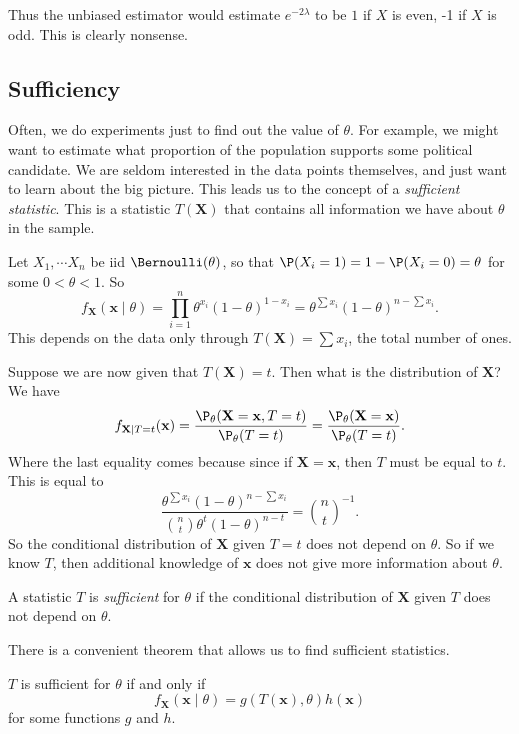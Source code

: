 \documentclass[a4paper]{article}
\begin{document}
Thus the unbiased estimator would estimate $e^{-2\lambda}$ to be $1$ if $X$ is even, -1 if $X$ is odd. This is clearly nonsense.
\subsection{Sufficiency}
Often, we do experiments just to find out the value of $\theta$. For example, we might want to estimate what proportion of the population supports some political candidate. We are seldom interested in the data points themselves, and just want to learn about the big picture. This leads us to the concept of a \emph{sufficient statistic}. This is a statistic $T(\mathbf{X})$ that contains all information we have about $\theta$ in the sample.

\begin{eg}
  Let $X_1, \cdots X_n$ be iid $\Bernoulli(\theta)$, so that $\P(X_i = 1) = 1 - \P(X_i = 0) = \theta$ for some $0 < \theta < 1$. So
  \[
    f_{\mathbf{X}} (\mathbf{x}\mid \theta) = \prod_{i = 1}^n \theta^{x_i}(1 - \theta)^{1 - x_i} = \theta^{\sum x_i}(1 - \theta)^{n - \sum x_i}.
  \]
  This depends on the data only through $T(\mathbf{X}) = \sum x_i$, the total number of ones.

  Suppose we are now given that $T(\mathbf{X}) = t$. Then what is the distribution of $\mathbf{X}$? We have
  \[
    f_{\mathbf{X}\mid T = t}(\mathbf{x}) = \frac{\P_\theta(\mathbf{X} = \mathbf{x}, T = t)}{\P_\theta (T = t)} = \frac{\P_\theta(\mathbf{X} = \mathbf{x})}{\P_\theta(T = t)}.
  \]
  Where the last equality comes because since if $\mathbf{X} = \mathbf{x}$, then $T$ must be equal to $t$. This is equal to
  \[
    \frac{\theta^{\sum x_i}(1 - \theta)^{n - \sum x_i}}{\binom{n}{t}\theta^t (1 - \theta)^{n - t}} = \binom{n}{t}^{-1}.
  \]
  So the conditional distribution of $\mathbf{X}$ given $T = t$ does not depend on $\theta$. So if we know $T$, then additional knowledge of $\mathbf{x}$ does not give more information about $\theta$.
\end{eg}

\begin{defi}
  A statistic $T$ is \emph{sufficient} for $\theta$ if the conditional distribution of $\mathbf{X}$ given $T$ does not depend on $\theta$.
\end{defi}

There is a convenient theorem that allows us to find sufficient statistics.
\begin{thm}
  $T$ is sufficient for $\theta$ if and only if
  \[
    f_{\mathbf{X}}(\mathbf{x} \mid \theta) = g(T(\mathbf{x}), \theta)h(\mathbf{x})
  \]
  for some functions $g$ and $h$.
\end{thm}
\end{document}
